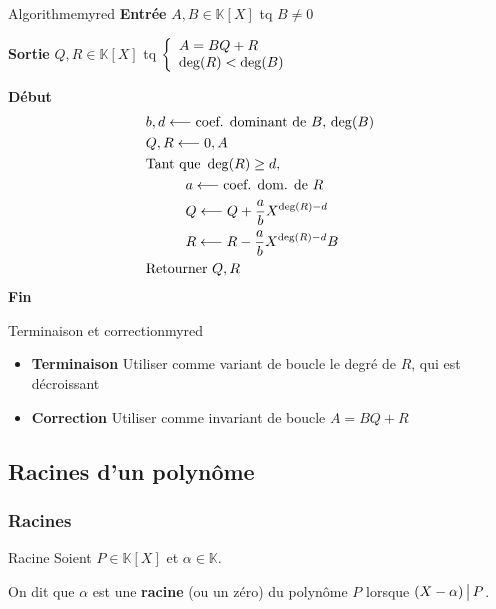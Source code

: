     \begin{omed}{Algorithme}{myred}
        \textbf{Entrée} $A,B \in \mathbb{K}[X]$ tq $B \neq 0$
        
        \textbf{Sortie} $Q,R \in \mathbb{K}[X]$ tq $\et{A = BQ + R}{\deg(R) < \deg(B)}$
        
        \textbf{Début}
        \begin{align*}
            &b,d \longleftarrow \text{coef. dominant de } B, \, \deg(B) \\
            &Q,R \longleftarrow 0,A \\
            &\text{Tant que } \deg(R) \geq d, \\
            &\hspace*{1cm} a \longleftarrow \text{coef. dom. de } R \\
            &\hspace*{1cm} Q \longleftarrow Q + \frac{a}{b} X^{\deg(R)-d} \\
            &\hspace*{1cm} R \longleftarrow R - \frac{a}{b} X^{\deg(R)-d}B \\
            &\text{Retourner } Q,R
        \end{align*}
        \textbf{Fin}
    \end{omed}
    
    \begin{demo}{Terminaison et correction}{myred}
        \begin{itemize}
            \item \textbf{Terminaison} \quad Utiliser comme variant de boucle le degré de $R$, qui est décroissant
            \item \textbf{Correction} \quad Utiliser comme invariant de boucle $A = BQ + R$
        \end{itemize}
    \end{demo}

\subsection{Racines d’un polynôme}

    \subsubsection{Racines}

    \begin{defi}{Racine}{}
        Soient $P \in \mathbb{K}[X]$ et $\alpha \in \mathbb{K}$.

        On dit que $\alpha$ est une \textbf{racine} (ou un zéro) du polynôme $P$ lorsque $(X-\alpha) \, \big| \, P$.
    \end{defi}
    
